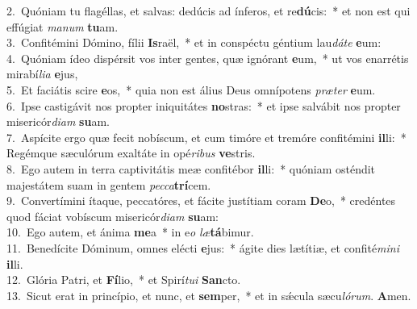 {2.~}Quóniam tu flagéllas, et salvas: dedúcis ad ínferos, et re\textbf{dú}cis:~* et non est qui effúgiat \textit{ma}\textit{num} \textbf{tu}am.\\
{3.~}Confitémini Dómino, fílii \textbf{Is}raël,~* et in conspéctu géntium lau\textit{dá}\textit{te} \textbf{e}um:\\
{4.~}Quóniam ídeo dispérsit vos inter gentes, quæ ignórant \textbf{e}um,~* ut vos enarrétis mirabí\textit{li}\textit{a} \textbf{e}jus,\\
{5.~}Et faciátis scire \textbf{e}os,~* quia non est álius Deus omnípotens \textit{præ}\textit{ter} \textbf{e}um.\\
{6.~}Ipse castigávit nos propter iniquitátes \textbf{no}stras:~* et ipse salvábit nos propter misericór\textit{di}\textit{am} \textbf{su}am.\\
{7.~}Aspícite ergo quæ fecit nobíscum, et cum timóre et tremóre confitémini \textbf{il}li:~* Regémque sæculórum exaltáte in opé\textit{ri}\textit{bus} \textbf{ve}stris.\\
{8.~}Ego autem in terra captivitátis meæ confitébor \textbf{il}li:~* quóniam osténdit majestátem suam in gentem \textit{pec}\textit{ca}\textbf{trí}cem.\\
{9.~}Convertímini ítaque, peccatóres, et fácite justítiam coram \textbf{De}o,~* credéntes quod fáciat vobíscum misericór\textit{di}\textit{am} \textbf{su}am:\\
{10.~}Ego autem, et ánima \textbf{me}a~* in e\textit{o} \textit{læ}\textbf{tá}bimur.\\
{11.~}Benedícite Dóminum, omnes elécti \textbf{e}jus:~* ágite dies lætítiæ, et confité\textit{mi}\textit{ni} \textbf{il}li.\\
{12.~}Glória Patri, et \textbf{Fí}lio,~* et Spirí\textit{tu}\textit{i} \textbf{San}cto.\\
{13.~}Sicut erat in princípio, et nunc, et \textbf{sem}per,~* et in sǽcula sæcu\textit{ló}\textit{rum}. \textbf{A}men.\\
